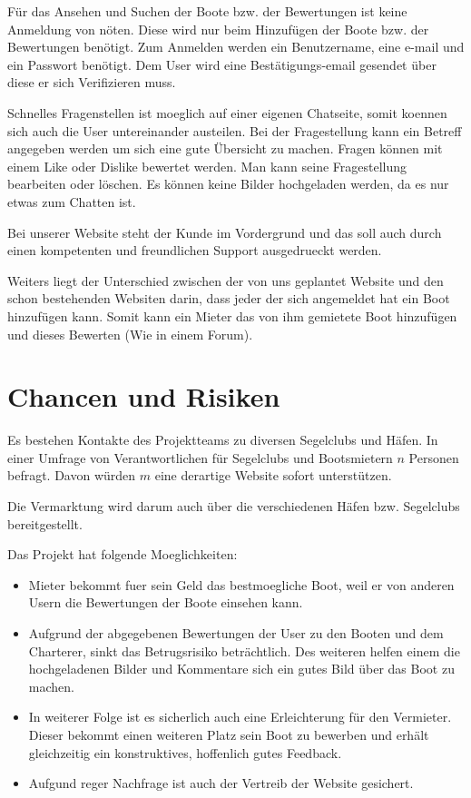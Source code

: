 \documentclass[12pt]{article}
\theoremstyle{definition}
\begin{document}
Für das Ansehen und Suchen der Boote bzw. der Bewertungen ist keine Anmeldung von nöten. Diese wird nur beim Hinzufügen der Boote bzw. der Bewertungen benötigt.
Zum Anmelden werden ein Benutzername, eine e-mail und ein Passwort benötigt. Dem User wird eine Bestätigungs-email gesendet über diese er sich Verifizieren muss. 
\item Schnelles Fragenstellen ist moeglich auf einer eigenen Chatseite, somit koennen sich auch die User untereinander austeilen. Bei der Fragestellung kann ein Betreff angegeben werden um sich eine gute Übersicht zu machen. Fragen können mit einem Like oder Dislike bewertet werden. Man kann seine Fragestellung bearbeiten oder löschen. Es können keine Bilder hochgeladen werden, da es nur etwas zum Chatten ist.
\item Bei unserer Website steht der Kunde im Vordergrund und das soll auch durch einen kompetenten und freundlichen Support ausgedrueckt werden. 

Weiters liegt der Unterschied zwischen der von uns geplantet Website und den schon bestehenden Websiten darin, dass jeder der sich angemeldet hat ein Boot hinzufügen kann. Somit kann ein Mieter das von ihm gemietete Boot hinzufügen und dieses Bewerten (Wie in einem Forum).

\pagebreak

\section{Chancen und Risiken}
Es bestehen Kontakte des Projektteams zu diversen Segelclubs und Häfen. In einer Umfrage von Verantwortlichen für Segelclubs und Bootsmietern $n$ Personen befragt. Davon würden $m$ eine derartige Website sofort unterstützen. 

Die Vermarktung wird  darum auch über die verschiedenen Häfen bzw. Segelclubs bereitgestellt.

Das Projekt hat folgende Moeglichkeiten:
\begin{itemize}
\item Mieter bekommt fuer sein Geld das bestmoegliche Boot, weil er von anderen Usern die Bewertungen der Boote einsehen kann.
\item Aufgrund der abgegebenen Bewertungen der User zu den Booten und dem Charterer, sinkt das Betrugsrisiko beträchtlich. Des weiteren helfen einem die hochgeladenen Bilder und Kommentare sich ein gutes Bild über das Boot zu machen.
\item In weiterer Folge ist es sicherlich auch eine Erleichterung für den Vermieter. Dieser bekommt einen weiteren Platz sein Boot zu bewerben und erhält gleichzeitig ein konstruktives, hoffenlich gutes Feedback.
\item Aufgund reger Nachfrage ist auch der Vertreib der Website gesichert.
\end{itemize}
\end{document}
